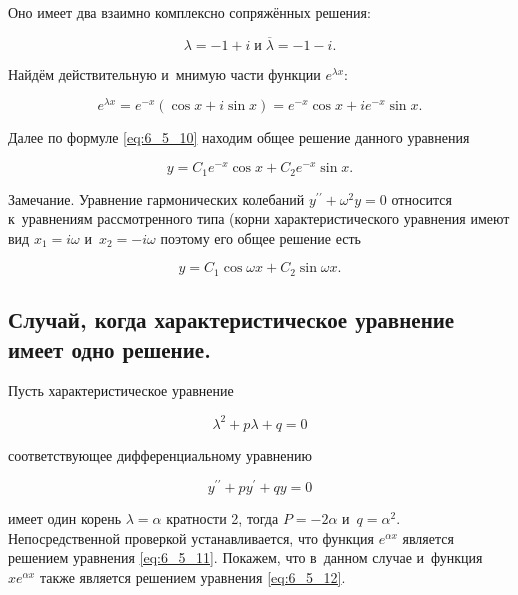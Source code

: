 \noindent
Оно имеет два взаимно комплексно сопряжённых решения:

\begin{equation*}
\lambda = -1 + i \; \text{и} \; \overline \lambda =-1 - i.
\end{equation*}

\noindent
Найдём действительную и~мнимую части функции $e^{\lambda x}$:

\begin{equation*}
e^{\lambda x} = 
e^{-x} (\cos x + i\sin x) = 
e^{-x} \cos x + i e^{-x} \sin x.
\end{equation*}

\noindent
Далее по формуле \eqref{eq:6_5_10} находим общее решение данного уравнения

\begin{equation*}
y = C_{1} e^{-x} \cos x + C_{2} e^{-x} \sin x.
\end{equation*}

Замечание. Уравнение гармонических колебаний $y^{\prime\prime} + \omega^{2} y = 0$
относится к~уравнениям рассмотренного типа (корни характеристического уравнения
имеют вид $x_{1} = i\omega$ и~$x_{2} = -i\omega$ поэтому его общее решение есть

\begin{equation*}
y = C_{1} \cos \omega x + C_{2} \sin \omega x.
\end{equation*}


\subsection{Случай, когда характеристическое уравнение имеет одно решение.}
Пусть характеристическое уравнение

\begin{equation}\label{eq:6_5_11}
\lambda^{2} + p\lambda + q = 0
\end{equation}

\noindent
соответствующее дифференциальному уравнению

\begin{equation}\label{eq:6_5_12}
y^{\prime\prime} + py^\prime + qy = 0
\end{equation}

\noindent
имеет один корень $\lambda = \alpha$ кратности 2, тогда $P = -2\alpha$ и~$q = \alpha^{2}$.
Непосредственной проверкой устанавливается, что функция $e^{\alpha x}$ является
решением уравнения \eqref{eq:6_5_11}.
Покажем, что в~данном случае и~функция $xe^{\alpha x}$ также является решением
уравнения \eqref{eq:6_5_12}.

